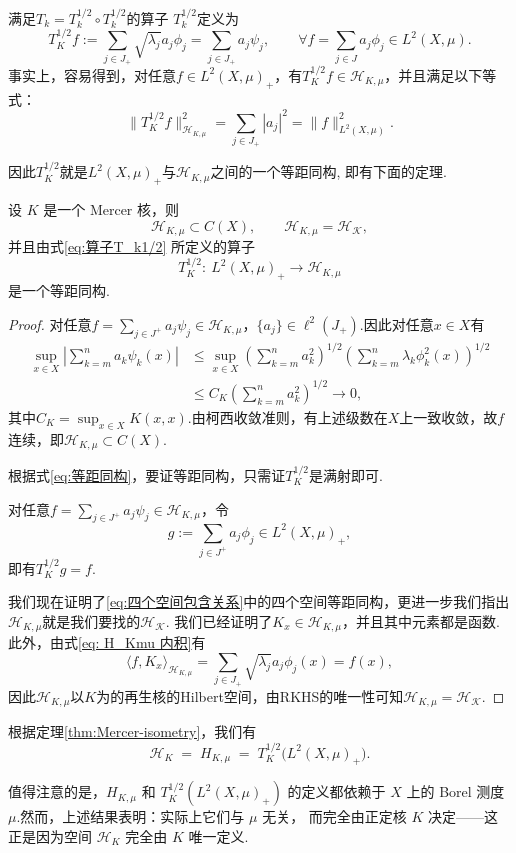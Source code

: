 \documentclass[../master.tex]{subfiles}
\begin{document}
满足\(T_k = T_k^{1/2}\circ T_k^{1/2}\)的算子 \(T_k^{1/2}\)定义为
\begin{equation}\label{eq:算子T_k1/2}
    T_K^{1/2}f:=\sum_{j\in J_+}\sqrt{\lambda_j}a_j\phi_j=\sum_{j\in J_+}a_j\psi_j,\qquad \forall f=\sum_{j\in J}a_j\phi_j\in L^2(X,\mu).
\end{equation}
事实上，容易得到，对任意$f\in L^2(X,\mu)_+$，有$T_K^{1/2}f\in \mathcal{H}_{K,\mu}$，并且满足以下等式：
\begin{equation}\label{eq:等距同构}
    \|T_K^{1/2}f\|_{\mathcal{H}_{K,\mu}}^2 = \sum_{j\in J_+}|a_j|^2 = \|f\|^2_{L^2(X,\mu)}.
\end{equation}

因此$T_K^{1/2}$就是$ L^2(X,\mu)_+$与$\mathcal{H}_{K,\mu}$之间的一个等距同构, 即有下面的定理.

\begin{theorem}\label{thm:Mercer-isometry}
设 $K$ 是一个 Mercer 核，则
\[
\mathcal{H}_{K,\mu}\subset C(X), \qquad \mathcal{H}_{K,\mu}=\mathcal {H_K},
\]
并且由式\eqref{eq:算子T_k1/2} 所定义的算子
\[
T_{K}^{1/2}:~L^{2}(X,\mu)_{+}\longrightarrow \mathcal{H}_{K,\mu}
\]
是一个等距同构.
\end{theorem}

\begin{proof}
    对任意$f = \sum_{j\in J^+}a_j\psi_j\in \mathcal{H}_{K,\mu}$，$\{a_j\}\in \ell^2(J_+)$.因此对任意$x\in X$有
    \begin{align*}
        \sup_{x\in X} \left|\sum_{k=m}^n a_k\psi_k(x)\right|&\leq \sup_{x\in X}\left(\sum_{k=m}^na_k^2\right)^{1/2}\left(\sum_{k=m}^n\lambda_k\phi^2_k(x)\right)^{1/2}\\
        &\leq C_K\left(\sum_{k=m}^na_k^2\right)^{1/2}\to 0,
    \end{align*}
其中$C_K = \sup_{x\in X}K(x,x)$.由柯西收敛准则，有上述级数在$X$上一致收敛，故$f$连续，即$\mathcal{H}_{K,\mu}\subset C(X).$

根据式\eqref{eq:等距同构}，要证等距同构，只需证$T_K^{1/2}$是满射即可.

对任意$f = \sum_{j\in J^+}a_j\psi_j\in \mathcal{H}_{K,\mu}$，令$$g:=\sum_{j\in J^+}a_j\phi_j\in L^2(X,\mu)_+,$$即有$T_K^{1/2}g = f$.

我们现在证明了\eqref{eq:四个空间包含关系}中的四个空间等距同构，更进一步我们指出$\mathcal{H}_{K,\mu}$就是我们要找的$\mathcal{H_K}.$
我们已经证明了$K_x\in\mathcal{H}_{K,\mu}$，并且其中元素都是函数.此外，由式\eqref{eq: H_Kmu 内积}有
\begin{equation*}
    \langle f,K_x\rangle_{\mathcal{H}_{K,\mu}}=\sum_{j\in J_+}\sqrt{\lambda_j}a_j\phi_j(x) = f(x),
\end{equation*}
因此$\mathcal{H}_{K,\mu}$以$K$为的再生核的Hilbert空间，由RKHS的唯一性可知$\mathcal{H}_{K,\mu}=\mathcal{H_K}.$
\end{proof}
根据定理\ref{thm:Mercer-isometry}，我们有
\[
\mathcal{H}_K \;=\; H_{K,\mu} \;=\; T_K^{1/2}\big(L^{2}(X,\mu)_{+}\big).
\]

值得注意的是，$H_{K,\mu}$ 和 $T_K^{1/2}\!\left(L^{2}(X,\mu)_{+}\right)$ 的定义都依赖于
$X$ 上的 Borel 测度 $\mu$.然而，上述结果表明：实际上它们与 $\mu$ 无关，
而完全由正定核 $K$ 决定——这正是因为空间 $\mathcal{H}_K$ 完全由 $K$ 唯一定义.
\end{document}
